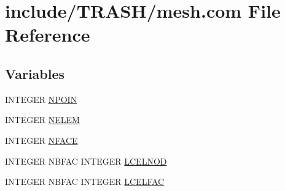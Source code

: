 \hypertarget{mesh_8com}{\section{include/\-T\-R\-A\-S\-H/mesh.com File Reference}
\label{mesh_8com}
}
\subsection*{Variables}
\begin{DoxyCompactItemize}
\item 
I\-N\-T\-E\-G\-E\-R \hyperlink{mesh_8com_ae28c1572321efcd8715b974d87d20c58}{N\-P\-O\-I\-N}
\item 
I\-N\-T\-E\-G\-E\-R \hyperlink{mesh_8com_aee5e75b79d0e815c0603cfbccc618957}{N\-E\-L\-E\-M}
\item 
I\-N\-T\-E\-G\-E\-R \hyperlink{mesh_8com_a78142d59d4cbb9fedbede16187658dd3}{N\-F\-A\-C\-E}
\item 
I\-N\-T\-E\-G\-E\-R N\-B\-F\-A\-C I\-N\-T\-E\-G\-E\-R \hyperlink{mesh_8com_ad60bfbd45e7524439e47beda45c898ef}{L\-C\-E\-L\-N\-O\-D}
\item 
I\-N\-T\-E\-G\-E\-R N\-B\-F\-A\-C I\-N\-T\-E\-G\-E\-R \hyperlink{mesh_8com_a1c18571472b5302b3a8ee29ece24bc40}{L\-C\-E\-L\-F\-A\-C}
\end{DoxyCompactItemize}


